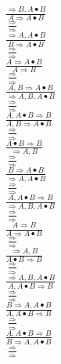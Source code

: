 \documentclass[11pt]{article}
\begin{document}
\begin{center}

$\frac{\Rightarrow B, A\bullet B}{A\Rightarrow A\bullet B}$
\bigskip
\\$\frac{\Rightarrow }{\Rightarrow }$
\bigskip
\\$\frac{\Rightarrow A, A\bullet B}{B\Rightarrow A\bullet B}$
\bigskip
\\$\frac{\Rightarrow }{\Rightarrow }$
\bigskip
\\$\frac{A\Rightarrow A\bullet B}{A\Rightarrow B}$
\bigskip
\\$\frac{\Rightarrow }{\Rightarrow }$
\bigskip
\\$\frac{A, B\Rightarrow A\bullet B}{\Rightarrow A, B, A\bullet B}$
\bigskip
\\$\frac{\Rightarrow }{\Rightarrow }$
\bigskip
\\$\frac{A, A\bullet B\Rightarrow B}{A, B\Rightarrow A\bullet B}$
\bigskip
\\$\frac{\Rightarrow }{\Rightarrow }$
\bigskip
\\$\frac{A\bullet B\Rightarrow B}{\Rightarrow A, B}$
\bigskip
\\$\frac{\Rightarrow }{\Rightarrow }$
\bigskip
\\$\frac{B\Rightarrow A\bullet B}{\Rightarrow A, A\bullet B}$
\bigskip
\\$\frac{\Rightarrow }{\Rightarrow }$
\bigskip
\\$\frac{A, A\bullet B\Rightarrow B}{\Rightarrow A, B, A\bullet B}$
\bigskip
\\$\frac{\Rightarrow }{\Rightarrow }$
\bigskip
\\$\frac{A\Rightarrow B}{A\Rightarrow A\bullet B}$
\bigskip
\\$\frac{\Rightarrow }{\Rightarrow }$
\bigskip
\\$\frac{\Rightarrow A, B}{A\bullet B\Rightarrow B}$
\bigskip
\\$\frac{\Rightarrow }{\Rightarrow }$
\bigskip
\\$\frac{\Rightarrow A, B, A\bullet B}{A, A\bullet B\Rightarrow B}$
\bigskip
\\$\frac{\Rightarrow }{\Rightarrow }$
\bigskip
\\$\frac{B\Rightarrow A, A\bullet B}{A, A\bullet B\Rightarrow B}$
\bigskip
\\$\frac{\Rightarrow }{\Rightarrow }$
\bigskip
\\$\frac{A, A\bullet B\Rightarrow B}{B\Rightarrow A, A\bullet B}$
\bigskip
\\$\frac{\Rightarrow }{\Rightarrow }$

\end{center}
\end{document}
